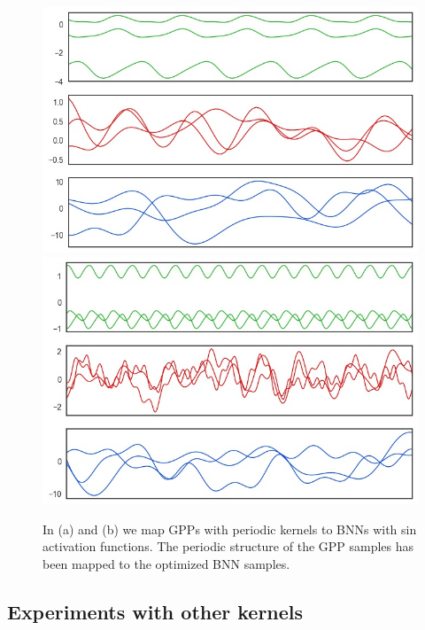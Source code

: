 \documentclass{article}
\begin{document}
\begin{figure}[h]\centering
{
\includegraphics[width=.45\textwidth]{figs/persin}
}
{
\includegraphics[width=.45\textwidth]{figs/persin2}
}
\hspace{2.5cm}
\caption{  In (a) and (b) we map GPPs with periodic kernels to BNNs with sin activation functions.
The periodic structure of the GPP samples has been mapped to the optimized BNN samples.} \label{fig:1}
\end{figure}

\subsection{Experiments with other kernels}
\end{document}
